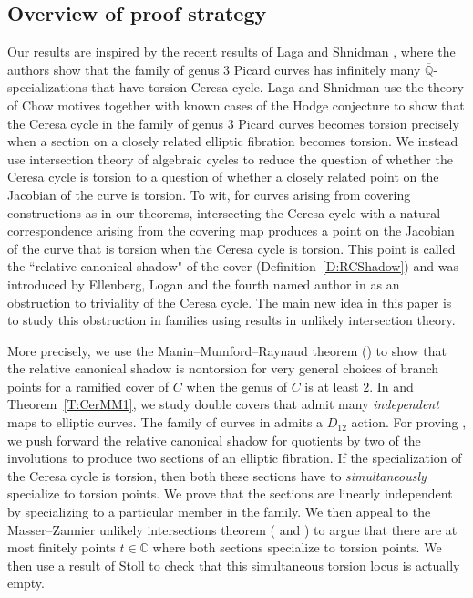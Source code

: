 \documentclass[reqno,10pt]{amsart}
\theoremstyle{definition}
\theoremstyle{definition}
\def\C{{\mathbb C}}
\def\C{{\mathbb C}}
\begin{document}
\subsection*{Overview of proof strategy} 
Our results are inspired by the recent results of Laga and Shnidman \cite[Theorem~C]{AriJef2}, where the authors show that the family of genus $3$ Picard curves has infinitely many $\overline{\mathbb{Q}}$-specializations that have torsion Ceresa cycle. Laga and Shnidman use the theory of Chow motives together with known cases of the Hodge conjecture to show that the Ceresa cycle in the family of genus $3$ Picard curves becomes torsion precisely when a section on a closely related elliptic fibration becomes torsion. We instead use intersection theory of algebraic cycles to reduce the question of whether the Ceresa cycle is torsion to a question of whether a closely related point on the Jacobian of the curve is torsion. To wit, for curves arising from covering constructions as in our theorems, intersecting the Ceresa cycle with a natural correspondence arising from the covering map produces a point on the Jacobian of the curve that is torsion when the Ceresa cycle is torsion. This point is called the ``relative canonical shadow" of the cover (Definition~\ref{D:RCShadow}) and was introduced by Ellenberg, Logan and the fourth named author in \cite{ELS} as an obstruction to triviality of the Ceresa cycle. The main new idea in this paper is to study this obstruction in families using results in unlikely intersection theory. 

More precisely, we use the Manin--Mumford--Raynaud theorem () to show that the relative canonical shadow is nontorsion for very general choices of branch points for a ramified  cover of $C$ when the genus of $C$ is at least $2$. In  and Theorem~\ref{T:CerMM1}, we study double covers that admit many {\textit{independent}} maps to elliptic curves. The family of curves in  admits a $D_{12}$ action. For proving , we push forward the relative canonical shadow for quotients by two of the involutions to produce two sections of an elliptic fibration. If the specialization of the Ceresa cycle is torsion, then both these sections have to \textit{simultaneously} specialize to torsion points. We prove that the sections are linearly independent by specializing to a particular member in the family. We then appeal to the Masser--Zannier unlikely intersections theorem ( and ) to argue that there are at most finitely points $t \in \C$ where both sections specialize to torsion points. We then use a result of Stoll \cite[Corollary~22]{Stoll} to check that this simultaneous torsion locus is actually empty. 
\end{document}
